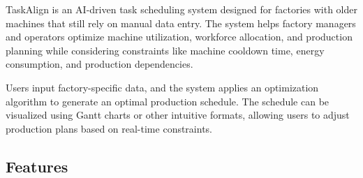 TaskAlign is an AI-driven task scheduling system designed for factories with older machines that still rely on manual data entry. The system helps factory managers and operators optimize machine utilization, workforce allocation, and production planning while considering constraints like machine cooldown time, energy consumption, and production dependencies.

Users input factory-specific data, and the system applies an optimization algorithm to generate an optimal production schedule. The schedule can be visualized using Gantt charts or other intuitive formats, allowing users to adjust production plans based on real-time constraints.

\subsection{Features}
\label{subsection:features}


